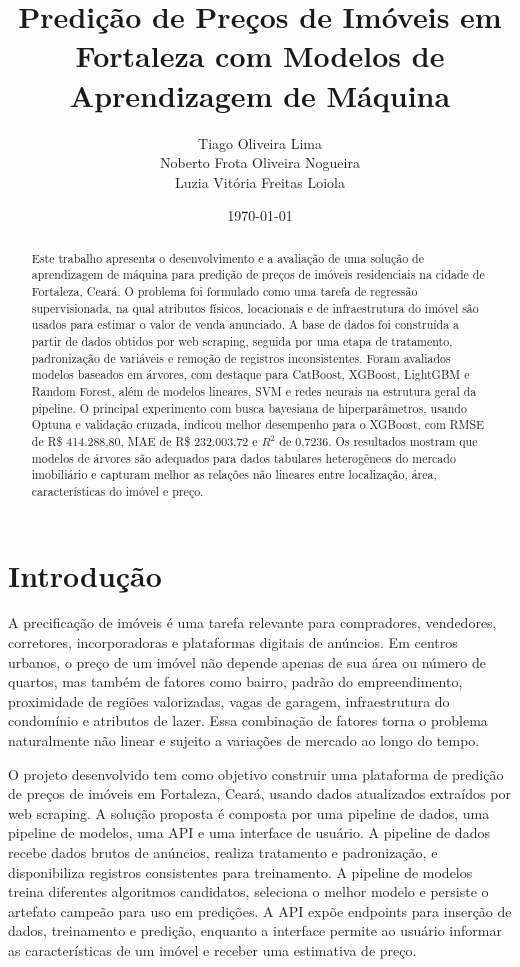 \documentclass[12pt,a4paper]{article}
\title{Predição de Preços de Imóveis em Fortaleza com Modelos de Aprendizagem de Máquina}
\author{Tiago Oliveira Lima \\ Noberto Frota Oliveira Nogueira \\ Luzia Vitória Freitas Loiola}
\date{\today}
\begin{document}
\maketitle

\begin{abstract}
Este trabalho apresenta o desenvolvimento e a avaliação de uma solução de aprendizagem de máquina para predição de preços de imóveis residenciais na cidade de Fortaleza, Ceará. O problema foi formulado como uma tarefa de regressão supervisionada, na qual atributos físicos, locacionais e de infraestrutura do imóvel são usados para estimar o valor de venda anunciado. A base de dados foi construída a partir de dados obtidos por web scraping, seguida por uma etapa de tratamento, padronização de variáveis e remoção de registros inconsistentes. Foram avaliados modelos baseados em árvores, com destaque para CatBoost, XGBoost, LightGBM e Random Forest, além de modelos lineares, SVM e redes neurais na estrutura geral da pipeline. O principal experimento com busca bayesiana de hiperparâmetros, usando Optuna e validação cruzada, indicou melhor desempenho para o XGBoost, com RMSE de R\$ 414.288,80, MAE de R\$ 232.003,72 e $R^2$ de 0,7236. Os resultados mostram que modelos de árvores são adequados para dados tabulares heterogêneos do mercado imobiliário e capturam melhor as relações não lineares entre localização, área, características do imóvel e preço.
\end{abstract}

\section{Introdução}

A precificação de imóveis é uma tarefa relevante para compradores, vendedores, corretores, incorporadoras e plataformas digitais de anúncios. Em centros urbanos, o preço de um imóvel não depende apenas de sua área ou número de quartos, mas também de fatores como bairro, padrão do empreendimento, proximidade de regiões valorizadas, vagas de garagem, infraestrutura do condomínio e atributos de lazer. Essa combinação de fatores torna o problema naturalmente não linear e sujeito a variações de mercado ao longo do tempo.

O projeto desenvolvido tem como objetivo construir uma plataforma de predição de preços de imóveis em Fortaleza, Ceará, usando dados atualizados extraídos por web scraping. A solução proposta é composta por uma pipeline de dados, uma pipeline de modelos, uma API e uma interface de usuário. A pipeline de dados recebe dados brutos de anúncios, realiza tratamento e padronização, e disponibiliza registros consistentes para treinamento. A pipeline de modelos treina diferentes algoritmos candidatos, seleciona o melhor modelo e persiste o artefato campeão para uso em predições. A API expõe endpoints para inserção de dados, treinamento e predição, enquanto a interface permite ao usuário informar as características de um imóvel e receber uma estimativa de preço.
\end{document}
